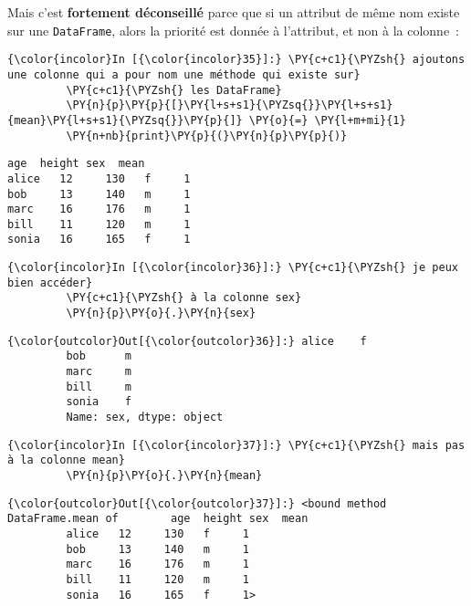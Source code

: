     Mais c'est \textbf{fortement déconseillé} parce que si un attribut de
même nom existe sur une \texttt{DataFrame}, alors la priorité est donnée
à l'attribut, et non à la colonne~:

    \begin{Verbatim}[commandchars=\\\{\}]
{\color{incolor}In [{\color{incolor}35}]:} \PY{c+c1}{\PYZsh{} ajoutons une colonne qui a pour nom une méthode qui existe sur}
         \PY{c+c1}{\PYZsh{} les DataFrame}
         \PY{n}{p}\PY{p}{[}\PY{l+s+s1}{\PYZsq{}}\PY{l+s+s1}{mean}\PY{l+s+s1}{\PYZsq{}}\PY{p}{]} \PY{o}{=} \PY{l+m+mi}{1}
         \PY{n+nb}{print}\PY{p}{(}\PY{n}{p}\PY{p}{)}
\end{Verbatim}


    \begin{Verbatim}[commandchars=\\\{\}]
       age  height sex  mean
alice   12     130   f     1
bob     13     140   m     1
marc    16     176   m     1
bill    11     120   m     1
sonia   16     165   f     1

    \end{Verbatim}

    \begin{Verbatim}[commandchars=\\\{\}]
{\color{incolor}In [{\color{incolor}36}]:} \PY{c+c1}{\PYZsh{} je peux bien accéder}
         \PY{c+c1}{\PYZsh{} à la colonne sex}
         \PY{n}{p}\PY{o}{.}\PY{n}{sex}
\end{Verbatim}


\begin{Verbatim}[commandchars=\\\{\}]
{\color{outcolor}Out[{\color{outcolor}36}]:} alice    f
         bob      m
         marc     m
         bill     m
         sonia    f
         Name: sex, dtype: object
\end{Verbatim}
            
    \begin{Verbatim}[commandchars=\\\{\}]
{\color{incolor}In [{\color{incolor}37}]:} \PY{c+c1}{\PYZsh{} mais pas à la colonne mean}
         \PY{n}{p}\PY{o}{.}\PY{n}{mean}
\end{Verbatim}


\begin{Verbatim}[commandchars=\\\{\}]
{\color{outcolor}Out[{\color{outcolor}37}]:} <bound method DataFrame.mean of        age  height sex  mean
         alice   12     130   f     1
         bob     13     140   m     1
         marc    16     176   m     1
         bill    11     120   m     1
         sonia   16     165   f     1>
\end{Verbatim}
            
